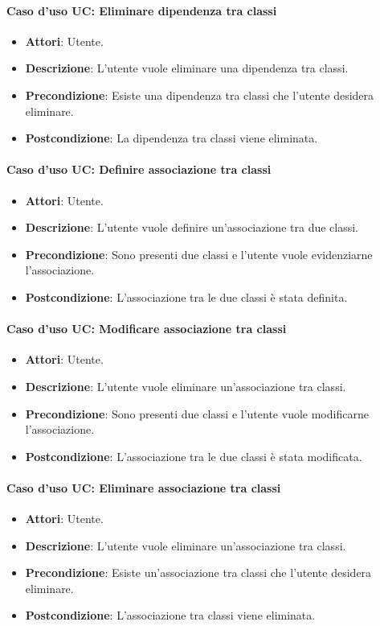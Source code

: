 \paragraph{Caso d'uso UC: Eliminare dipendenza tra classi}
\begin{itemize}
	\item\textbf{Attori}: Utente.
	\item\textbf{Descrizione}: L'utente vuole eliminare una dipendenza tra classi.
	\item\textbf{Precondizione}: Esiste una dipendenza tra classi che l'utente desidera eliminare.
	\item\textbf{Postcondizione}: La dipendenza tra classi viene eliminata.
\end{itemize}

\paragraph{Caso d'uso UC: Definire associazione tra classi}
\begin{itemize}
	\item\textbf{Attori}: Utente.
	\item\textbf{Descrizione}: L'utente vuole definire un'associazione tra due classi.
	\item\textbf{Precondizione}: Sono presenti due classi e l'utente vuole evidenziarne l'associazione.
	\item\textbf{Postcondizione}: L'associazione tra le due classi è stata definita.
\end{itemize}

\paragraph{Caso d'uso UC: Modificare associazione tra classi}
\begin{itemize}
	\item\textbf{Attori}: Utente.
	\item\textbf{Descrizione}: L'utente vuole eliminare un'associazione tra classi.
	\item\textbf{Precondizione}: Sono presenti due classi e l'utente vuole modificarne l'associazione.
	\item\textbf{Postcondizione}: L'associazione tra le due classi è stata modificata.
\end{itemize}

\paragraph{Caso d'uso UC: Eliminare associazione tra classi}
\begin{itemize}
	\item\textbf{Attori}: Utente.
	\item\textbf{Descrizione}: L'utente vuole eliminare un'associazione tra classi.
	\item\textbf{Precondizione}: Esiste un'associazione tra classi che l'utente desidera eliminare.
	\item\textbf{Postcondizione}: L'associazione tra classi viene eliminata.
\end{itemize}

